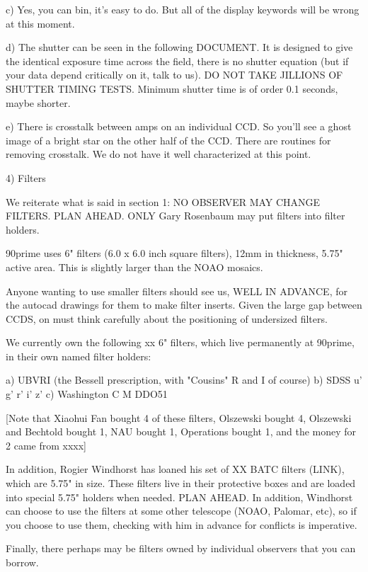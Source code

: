 \documentclass[letterpaper,12pt]{article}
\begin{document}
c) Yes, you can bin, it's easy to do. But all of the
display keywords will be wrong at this moment.

d) The shutter can be seen in the following DOCUMENT. It is
designed to give the identical exposure time across the field,
there is no shutter equation (but if your data depend
critically on it, talk to us). DO NOT TAKE JILLIONS
OF SHUTTER TIMING TESTS. Minimum shutter time is of order
0.1 seconds, maybe shorter.

e) There is crosstalk between amps on an individual CCD.
So you'll see a ghost image of a bright star on
the other half of the CCD. There are routines for removing
crosstalk. We do not have it well characterized at this point.



4) Filters

We reiterate what is said in section 1: NO OBSERVER MAY
CHANGE FILTERS. PLAN AHEAD. ONLY Gary Rosenbaum may
put filters into filter holders.

90prime uses 6" filters (6.0 x 6.0 inch square filters), 12mm
in thickness, 5.75" active area. This is slightly larger
than the NOAO mosaics. 

Anyone wanting to use smaller filters should see us, WELL IN ADVANCE,
for the autocad drawings for them to make filter inserts. Given
the large gap between CCDS, on must think carefully about
the positioning of undersized filters.

We currently own the following xx 6" filters, which live
permanently at 90prime, in their own named filter holders:

a) UBVRI (the Bessell prescription, with "Cousins" R and I of course)
b) SDSS u' g' r' i' z' 
c) Washington C M DDO51

[Note that Xiaohui Fan bought 4 of these filters, Olszewski
bought 4, Olszewski and Bechtold bought 1, NAU bought 1, Operations
bought 1, and the money for 2 came from xxxx]

In addition, Rogier Windhorst has loaned his set of XX BATC filters (LINK),
which are 5.75" in size. These filters live in their protective
boxes and are loaded into special 5.75" holders when needed. PLAN AHEAD.
In addition, Windhorst can choose to use the filters at some other
telescope (NOAO, Palomar, etc), so if you choose to use them,
checking with him in advance for conflicts is imperative.

Finally, there perhaps may be filters owned by individual observers
that you can borrow. 
\end{document}

